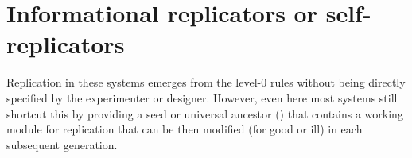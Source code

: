 \section{Informational replicators or self-replicators}
\begin{NOTES}
Replication in these systems emerges from the level-0 rules without being directly specified by the experimenter or designer. However, even here most systems still shortcut this by providing a seed or universal ancestor (\eg \cite{Ofria2004}) that contains a working module for replication that can be then modified (for good or ill) in each subsequent generation.
%
%


\end{NOTES}
